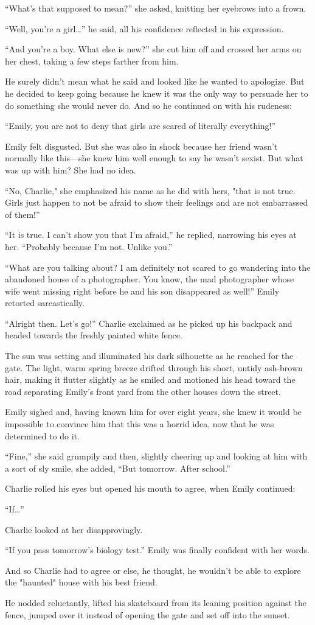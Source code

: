 “What’s that supposed to mean?” she asked, knitting her eyebrows into a frown.

“Well, you’re a girl…” he said, all his confidence reflected in his expression.

“And you’re a boy. What else is new?” she cut him off and crossed her arms on her chest, taking a few steps farther from him.

He surely didn’t mean what he said and looked like he wanted to apologize. But he decided to keep going because he knew 
it was the only way to persuade her to do something she would never do. And so he continued on with his rudeness:

“Emily, you are not to deny that girls are scared of literally everything!”

Emily felt disgusted. But she was also in shock because her friend wasn’t normally like this—she knew him well enough to say he wasn’t sexist.
But what was up with him? She had no idea.

“No, Charlie," she emphasized his name as he did with hers, "that is not true. Girls just happen to not be afraid to show their feelings and are not 
embarrassed of them!”

“It is true. I can’t show you that I’m afraid,” he replied, narrowing his eyes at her. “Probably because I’m not. Unlike you.”

“What are you talking about? I am definitely not scared to go wandering into the abandoned house of a photographer. You know, the mad photographer 
whose wife went missing right before he and his son disappeared as well!” Emily retorted sarcastically.

“Alright then. Let’s go!” Charlie exclaimed as he picked up his backpack and headed towards the freshly painted white fence.

The sun was setting and illuminated his dark silhouette as he reached for the gate. The light, warm spring breeze drifted 
through his short, untidy ash-brown hair, making it flutter slightly as he smiled and motioned his head toward the road 
separating Emily’s front yard from the other houses down the street.

Emily sighed and, having known him for over eight years, she knew it would be impossible to convince him that this was a horrid idea, now 
that he was determined to do it.

“Fine,” she said grumpily and then, slightly cheering up and looking at him with a sort of sly smile, she added, “But tomorrow. After school.”

Charlie rolled his eyes but opened his mouth to agree, when Emily continued:

“If…”

Charlie looked at her disapprovingly.

“If you pass tomorrow’s biology test.” Emily was finally confident with her words.

And so Charlie had to agree or else, he thought, he wouldn’t be able to explore the "haunted" house with his best friend.
 
He nodded reluctantly, lifted his skateboard from its leaning position against the fence, 
jumped over it instead of opening the gate and set off into the sunset.
